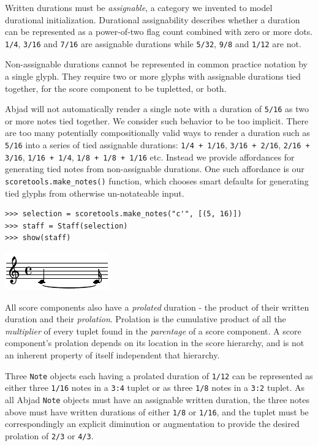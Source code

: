 Written durations must be \emph{assignable}, a category we invented to model
durational initialization. Durational assignability describes whether a
duration can be represented as a power-of-two flag count combined with zero or
more dots. \texttt{1/4}, \texttt{3/16} and \texttt{7/16} are assignable
durations while \texttt{5/32}, \texttt{9/8} and \texttt{1/12} are not.

Non-assignable durations cannot be represented in common practice notation by a
single glyph. They require two or more glyphs with assignable durations tied
together, for the score component to be tupletted, or both.

Abjad will not automatically render a single note with a duration of
\texttt{5/16} as two or more notes tied together. We consider such behavior to
be too implicit. There are too many potentially compositionally valid ways to
render a duration such as \texttt{5/16} into a series of tied assignable
durations: \texttt{1/4 + 1/16}, \texttt{3/16 + 2/16}, \texttt{2/16 + 3/16},
\texttt{1/16 + 1/4}, \texttt{1/8 + 1/8 + 1/16} etc. Instead we provide
affordances for generating tied notes from non-assignable durations. One such
affordance is our \texttt{scoretools.make\_notes()} function, which chooses
smart defaults for generating tied glyphs from otherwise un-notateable input.

\begin{lstlisting}
>>> selection = scoretools.make_notes("c'", [(5, 16)])
>>> staff = Staff(selection)
>>> show(staff)
\end{lstlisting}

\includegraphics[scale=1.0]{images/notational_isomorphism-4.pdf}


All score components also have a \emph{prolated} duration - the product of
their written duration and their \emph{prolation}. Prolation is the cumulative
product of all the \emph{multiplier} of every tuplet found in the
\emph{parentage} of a score component. A score component's prolation depends on
its location in the score hierarchy, and is not an inherent property of itself
independent that hierarchy.

Three \texttt{Note} objects each having a prolated duration of \texttt{1/12}
can be represented as either three \texttt{1/16} notes in a \texttt{3:4} tuplet
or as three \texttt{1/8} notes in a \texttt{3:2} tuplet. As all Abjad
\texttt{Note} objects must have an assignable written duration, the three notes
above must have written durations of either \texttt{1/8} or \texttt{1/16}, and
the tuplet must be correspondingly an explicit diminution or augmentation to
provide the desired prolation of \texttt{2/3} or \texttt{4/3}.

